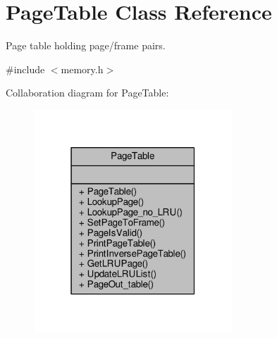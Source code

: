\hypertarget{classPageTable}{}\section{Page\+Table Class Reference}
\label{classPageTable}


Page table holding page/frame pairs.  




{\ttfamily \#include $<$memory.\+h$>$}



Collaboration diagram for Page\+Table\+:
\nopagebreak
\begin{figure}[H]
\begin{center}
\leavevmode
\includegraphics[width=211pt]{classPageTable__coll__graph}
\end{center}
\end{figure}
